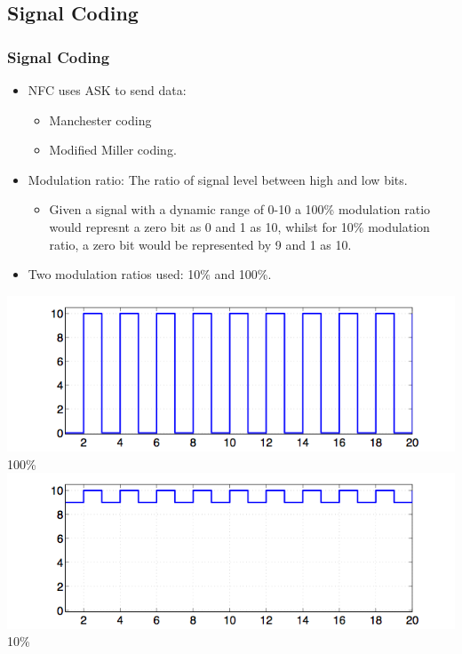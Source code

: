\documentclass{beamer}
\begin{document}
\subsection{Signal Coding}
\begin{frame}
\frametitle{Signal Coding}
\begin{itemize}
\item NFC uses ASK to send data:
\begin{itemize}
\item Manchester coding
\item Modified Miller coding.
\end{itemize}
\item Modulation ratio: The ratio of signal level between high and low bits.
\begin{itemize}
\item Given a signal with a dynamic range of 0-10 a 100\% modulation ratio would represnt a zero bit as 0 and 1 as 10, whilst for 10\% modulation ratio, a zero bit would be represented by 9 and 1 as 10.
\end{itemize}
\item Two modulation ratios used: 10\% and 100\%.
\end{itemize}
\includegraphics[scale=0.25]{100.png} 100\%\\
\includegraphics[scale=0.25]{10.png} 10\%
\end{frame}
\end{document}
